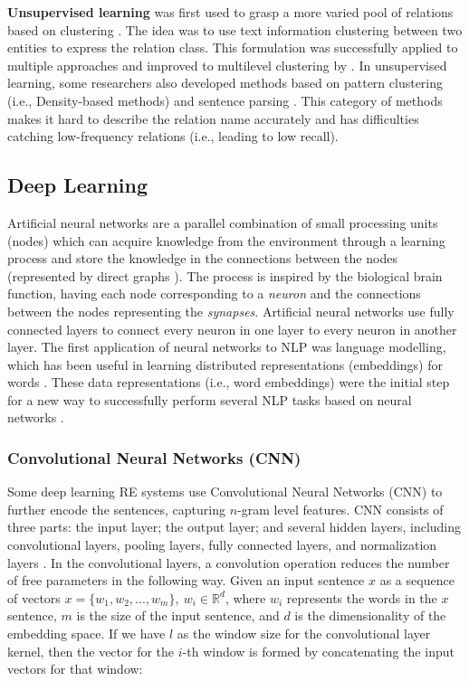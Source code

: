 \textbf{Unsupervised learning} was first used to grasp a more varied pool of relations based on clustering \citep{hasegawa2004discovering,shinyama2006preemptive}. 
The idea was to use text information clustering between two entities to express the relation class. This formulation was successfully applied to multiple approaches and improved to multilevel clustering by \cite{shinyama2006preemptive}. In unsupervised learning, some researchers also developed methods based on pattern clustering (i.e., Density-based methods) and sentence parsing \citep{quan2014unsupervised}. 
This category of methods makes it hard to describe the relation name accurately and has difficulties catching low-frequency relations (i.e., leading to low recall).


\hypertarget{2.1.4}{\subsection{Deep Learning}}

Artificial neural networks are a parallel combination of small processing units (nodes) which can acquire knowledge from the environment through a learning process and store the knowledge in the connections between the nodes \citep{haykin1994neural} (represented by direct graphs \citep{guresen2011definition}). The process is inspired by the biological brain function, having each node corresponding to a \textit{neuron} and the connections between the nodes representing the \textit{synapses}. Artificial neural networks use fully connected layers to connect every neuron in one layer to every neuron in another layer. 
The first application of neural networks to NLP was language modelling, which has been useful in learning distributed representations (embeddings) for words \citep{bengio2003neural,mikolov2013distributed}. These data representations (i.e., word embeddings) were the initial step for a new way to successfully perform several NLP tasks based on neural networks \citep{nguyen2015relation}.  


\subsubsection{Convolutional Neural Networks (CNN)}

Some deep learning RE systems use Convolutional Neural Networks (CNN) to further encode the sentences, capturing $n$-gram level features. CNN consists of three parts: the input layer; the output layer; and several hidden layers, including convolutional layers, pooling layers, fully connected layers, and normalization layers \citep{xue2018relation}. 
In the convolutional layers, a convolution operation reduces the number of free parameters in the following way. Given an input sentence $x$ as a sequence of vectors $x = \{w_1,w_2,...,w_m\},\ w_i \in \mathbb{R}^d$, where $w_i$ represents the words in the $x$ sentence,  $m$ is the size of the input sentence, and $d$ is the dimensionality of the embedding space. If we have $l$ as the window size for the convolutional layer kernel, then the vector for the $i$-th window is formed by concatenating the input vectors for that window:

